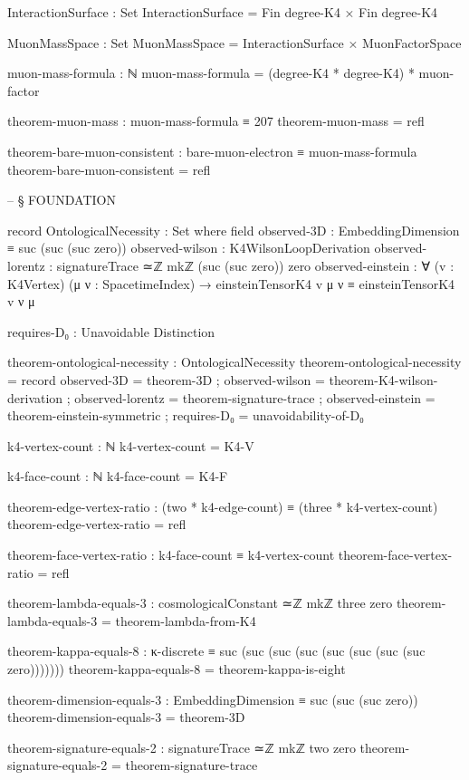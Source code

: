 \documentclass[11pt,a4paper]{book}
\begin{document}
\begin{code}
InteractionSurface : Set
InteractionSurface = Fin degree-K4 × Fin degree-K4

MuonMassSpace : Set
MuonMassSpace = InteractionSurface × MuonFactorSpace

muon-mass-formula : ℕ
muon-mass-formula = (degree-K4 * degree-K4) * muon-factor

theorem-muon-mass : muon-mass-formula ≡ 207
theorem-muon-mass = refl

theorem-bare-muon-consistent : bare-muon-electron ≡ muon-mass-formula
theorem-bare-muon-consistent = refl


-- § FOUNDATION

record OntologicalNecessity : Set where
  field
    observed-3D          : EmbeddingDimension ≡ suc (suc (suc zero))
    observed-wilson      : K4WilsonLoopDerivation
    observed-lorentz     : signatureTrace ≃ℤ mkℤ (suc (suc zero)) zero
    observed-einstein    : ∀ (v : K4Vertex) (μ ν : SpacetimeIndex) → 
                           einsteinTensorK4 v μ ν ≡ einsteinTensorK4 v ν μ
    
    requires-D₀ : Unavoidable Distinction

theorem-ontological-necessity : OntologicalNecessity
theorem-ontological-necessity = record
  { observed-3D          = theorem-3D
  ; observed-wilson      = theorem-K4-wilson-derivation
  ; observed-lorentz     = theorem-signature-trace
  ; observed-einstein    = theorem-einstein-symmetric
  ; requires-D₀          = unavoidability-of-D₀
  }

k4-vertex-count : ℕ
k4-vertex-count = K4-V

k4-face-count : ℕ
k4-face-count = K4-F

theorem-edge-vertex-ratio : (two * k4-edge-count) ≡ (three * k4-vertex-count)
theorem-edge-vertex-ratio = refl

theorem-face-vertex-ratio : k4-face-count ≡ k4-vertex-count
theorem-face-vertex-ratio = refl

theorem-lambda-equals-3 : cosmologicalConstant ≃ℤ mkℤ three zero
theorem-lambda-equals-3 = theorem-lambda-from-K4

theorem-kappa-equals-8 : κ-discrete ≡ suc (suc (suc (suc (suc (suc (suc (suc zero)))))))
theorem-kappa-equals-8 = theorem-kappa-is-eight

theorem-dimension-equals-3 : EmbeddingDimension ≡ suc (suc (suc zero))
theorem-dimension-equals-3 = theorem-3D

theorem-signature-equals-2 : signatureTrace ≃ℤ mkℤ two zero
theorem-signature-equals-2 = theorem-signature-trace


\end{code}
\end{document}
